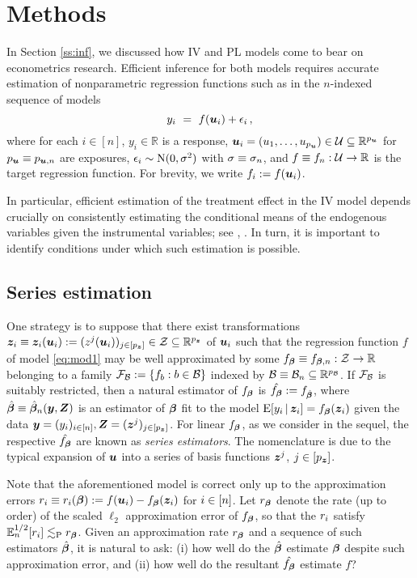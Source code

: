 \documentclass{uwstat572}
\newcommand{\be}{\begin{equation}}
\newcommand{\ee}{\end{equation}}
\theoremstyle{definition}
\theoremstyle{remark}
\newcommand{\R}{\ensuremath{\mathbb{R}}}
\newcommand{\Prb}{\mathrm{P}}
\newcommand{\E}{\mathrm{E}}
\newcommand{\Ex}{\mathbb{E}}
\newcommand{\Exn}{\Ex_n}
\newcommand{\Normal}{\mathrm{N}}
\numberwithin{equation}{section}
\begin{document}
\section{Methods}

In Section \ref{ss:inf}, we discussed how IV and PL models come to bear on econometrics research. Efficient inference for both models requires accurate estimation of nonparametric regression functions such as in the $n$-indexed sequence of models
\be\label{eq:mod1}
	y_i \ = \ f(\u_i) + \ersi\,,
\ee
where for each $i\in[n]$, $y_i \in \R$ is a response, $\u_i = (u_1,\ldots,u_{\pu}) \in \Us \subseteq \R^{\pu}$ for $p_{\boldsymbol{u}} \equiv p_{\boldsymbol{u},n}$ are exposures, $\ersi \sim \Normal(0,\sd^2)$ with $\sigma \equiv \sigma_n$, and $f \equiv f_n : \Us \to \R$ is the target regression function. For brevity, we write $f_i := f(\boldsymbol{u}_i)$. 

In particular, efficient estimation of the treatment effect in the IV model depends crucially on consistently estimating the conditional means of the endogenous variables given the instrumental variables; see \cite{A74}, \cite{N90}. In turn, it is important to identify conditions under which such estimation is possible. 




%
% 
\subsection{Series estimation}\label{ss:se}

One strategy is to suppose that there exist transformations $\z_i \equiv \z_i(\u_i) := (z^j(\u_i))_{j\in[\pz]} \in \Zs \subseteq \R^{\pz}$ of $\boldsymbol{u}_i$ such that the regression function $f$ of model \eqref{eq:mod1} may be well approximated by some $\fb \equiv \fbn : \Zs \to \R$ belonging to a family $\mathcal{F}_{\mathcal{B}} := \{ f_b:b\in\mathcal{B}\}$ indexed by $\Bs \equiv \Bs_n \subseteq \R^{p_\Bs}$. If $\mathcal{F}_{\mathcal{B}}$ is suitably restricted, then a natural estimator of $f_{\boldsymbol{\beta}}$ is $\hat{f_{\boldsymbol{\beta}}} := f_{\hat{\boldsymbol{\beta}}}$, where $\hat{\boldsymbol{\beta}} \equiv \hat{\boldsymbol{\beta}}_n(\boldsymbol{y}, \boldsymbol{Z})$ is an estimator of $\boldsymbol{\beta}$ fit to the model $\E[y_i\,|\,\z_i] = \fb(\z_i)$ given the data $\boldsymbol{y} = (y_i)_{i\in[n]}, \boldsymbol{Z} = (\boldsymbol{z}^j)_{j\in[{p_{\boldsymbol{z}}}]}$. For linear $f_{\boldsymbol{\beta}}$, as we consider in the sequel, the respective $\hat{f_{\boldsymbol{\beta}}}$ are known as \emph{series estimators}. The nomenclature is due to the typical expansion of $\boldsymbol{u}$ into a series of basis functions $\boldsymbol{z}^j$, $j\in[{p_{\boldsymbol{z}}}]$. 

Note that the aforementioned model is correct only up to the approximation errors $r_i \equiv r_i(\boldsymbol{\beta}) := f(\boldsymbol{u}_i) - f_{\boldsymbol{\beta}}(\boldsymbol{z}_i)$ for $i\in[n]$. Let $r_{\boldsymbol{\beta}}$ denote the rate (up to order) of the scaled $\ell_2$ approximation error of $f_{\boldsymbol{\beta}}$, so that the $r_i$ satisfy $\Exn^{1/2}[r_i] \lesssim_\Prb \rb$. Given an approximation rate $r_{\boldsymbol{\beta}}$ and a sequence of such estimators $\hat{\boldsymbol{\beta}}$, it is natural to ask: (i) how well do the $\hat{\boldsymbol{\beta}}$ estimate $\boldsymbol{\beta}$ despite such approximation error, and (ii) how well do the resultant $\hat{f_{\boldsymbol{\beta}}}$ estimate $f$? 
\end{document}
